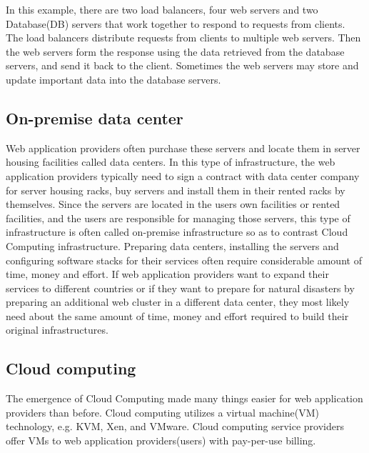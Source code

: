 In this example, there are two load balancers, four web servers and two Database(DB) servers that work together to respond to requests from clients.
The load balancers distribute requests from clients to multiple web servers. 
Then the web servers form the response using the data retrieved from the database servers, and send it back to the client.
Sometimes the web servers may store and update important data into the database servers.

\subsection{On-premise data center}

Web application providers often purchase these servers and locate them in server housing facilities called data centers.
In this type of infrastructure, the web application providers typically need to sign a contract with data center company for server housing racks, buy servers and install them in their rented racks by themselves.
Since the servers are located in the users own facilities or rented facilities, and the users are responsible for managing those servers, this type of infrastructure is often called on-premise infrastructure so as to contrast Cloud Computing infrastructure.
Preparing data centers, installing the servers and configuring software stacks for their services often require considerable amount of time, money and effort.
If web application providers want to expand their services to different countries or if they want to prepare for natural disasters by preparing an additional web cluster in a different data center, they most likely need about the same amount of time, money and effort required to build their original infrastructures.

\subsection{Cloud computing}

The emergence of Cloud Computing made many things easier for web application providers than before.
Cloud computing utilizes a virtual machine(VM) technology, e.g. KVM, Xen, and VMware.
Cloud computing service providers offer VMs to web application providers(users) with pay-per-use billing.

